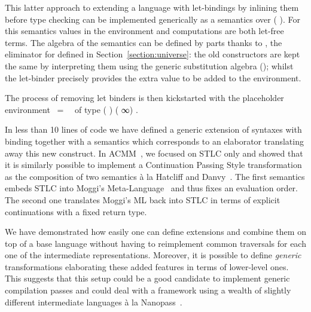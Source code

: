 This latter approach to extending a language  with let-bindings
by inlining them before type checking can be implemented generically as
a semantics over (  ). For this semantics values
in the environment and computations are both let-free terms. The algebra
of the semantics can be defined by parts thanks to , the eliminator
for  defined in Section~\ref{section:universe}:
the old constructors are kept the same by
interpreting them using the generic substitution algebra ();
whilst the let-binder precisely provides the extra value to be added to the
environment.

\begin{agdasnippet}
\end{agdasnippet}

The process of removing let binders is then kickstarted with the placeholder
environment ~=~~ 
of type {( ) (  ∞) }. 

\begin{agdasnippet}
\end{agdasnippet}

In less than 10 lines of code we have defined a generic extension of
syntaxes with binding together with a semantics which corresponds
to an elaborator translating away this new construct.
In ACMM~\citeyear{allais2017type}, we focused on STLC only
and showed that it is similarly possible to implement a Continuation
Passing Style transformation as the composition of two semantics
à la Hatcliff and Danvy~\citeyear{hatcliff1994generic}.
The first semantics embeds STLC into Moggi's
Meta-Language~\citeyear{DBLP:journals/iandc/Moggi91} and thus fixes
an evaluation order. The second one translates Moggi's ML back into
STLC in terms of explicit continuations with a fixed return type.

We have demonstrated how easily one can define extensions and combine
them on top of a base language without having to reimplement common
traversals for each one of the intermediate representations. Moreover,
it is possible to define \emph{generic} transformations elaborating
these added features in terms of lower-level ones. This suggests that
this setup could be a good candidate to implement generic compilation
passes and could deal with a framework using a wealth of slightly
different intermediate languages à la Nanopass~\cite{Keep:2013:NFC:2544174.2500618}.
